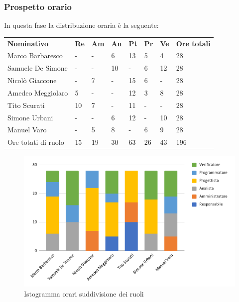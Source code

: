     \subsubsection{Prospetto orario}
    In questa fase la distribuzione oraria è la seguente:
        \begin{center}
            \begin{table}[ht!]
                \centering
                \renewcommand{\arraystretch}{1.8}
                \begin{tabular}{p{100px} p{20px} p{20px} p{20px} p{20px} p{20px} p{20px} p{50px} }
                    \rowcolor{logo!70} \textbf{Nominativo} & \textbf{Re} & \textbf{Am} & \textbf{An} & \textbf{Pt} & \textbf{Pr} & \textbf{Ve} & \textbf{Ore totali}\\
                    Marco Barbaresco & - & - & 6 & 13 & 5 & 4 & 28\\
                    Samuele De Simone & - & - & 10 & - & 6 & 12 & 28\\
                    Nicolò Giaccone & - & 7 & - & 15 & 6 & - & 28\\
                    Amedeo Meggiolaro & 5 & - & - & 12 & 3 & 8 & 28\\
                    Tito Scurati & 10 & 7 & - & 11 & - & - & 28\\
                    Simone Urbani & - & - & 6 & 12 & - & 10 & 28\\
                    Manuel Varo & - & 5 & 8 & - & 6 & 9 & 28\\
                    Ore totati di ruolo & 15 & 19 & 30 & 63 & 26 & 43 & 196\\
                \end{tabular}
            \end{table}
        \end{center}
        \pagebreak
        
        \begin{figure}[!h]
            \caption{Istogramma orari suddivisione dei ruoli}
            \vspace{5px}
            \includegraphics[scale=0.6]{../../../Images/Diagrammi/Istogrammi/ore architettura.png}
            \centering
        \end{figure}
